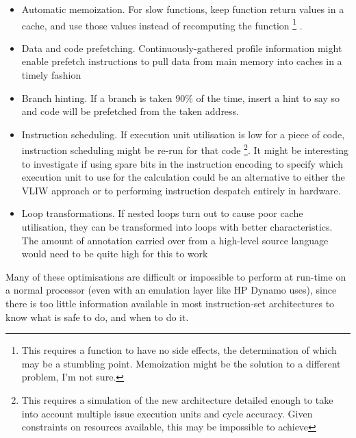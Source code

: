 \begin{itemize}
\item Automatic memoization. For slow functions, keep function return values
in a cache, and use those values instead of recomputing the function%
\footnote{This requires a function to have no side effects, the determination
of which may be a stumbling point. Memoization might be the solution
to a different problem, I'm not sure.%
} \cite{Michie 68}.

\item Data and code prefetching. Continuously-gathered profile information
might enable prefetch instructions to pull data from main memory into
caches in a timely fashion

\item Branch hinting. If a branch is taken 90\% of the time, insert a hint
to say so and code will be prefetched from the taken address.

\item Instruction scheduling. If execution unit utilisation is low for a
piece of code, instruction scheduling might be re-run for that code%
\footnote{This requires a simulation of the new architecture detailed enough
to take into account multiple issue execution units and cycle accuracy.
Given constraints on resources available, this may be impossible to
achieve%
}. It might be interesting to investigate if using spare bits in the
instruction encoding to specify which execution unit to use for the
calculation could be an alternative to either the VLIW approach or
to performing instruction despatch entirely in hardware.

\item Loop transformations. If nested loops turn out to cause poor cache
utilisation, they can be transformed into loops with better characteristics.
The amount of annotation carried over from a high-level source language
would need to be quite high for this to work

\end{itemize}

Many of these optimisations are difficult or impossible to perform
at run-time on a normal processor (even with an emulation layer like
HP Dynamo uses), since there is too little information available in
most instruction-set architectures to know what is safe to do, and
when to do it.

